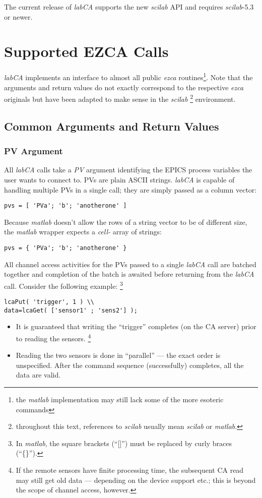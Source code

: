 \documentclass{article}
\newcommand{\sca}{\ita{labCA}}
\newcommand{\scilab}{\ita{scilab}}
\newcommand{\matlab}{\ita{matlab}}
\newcommand{\ezca}{\ita{ezca}}
\newcommand{\pbrk}{\pagebreak[3]}
\newcommand{\ita}[1]{\emph{#1}}
\renewcommand{\pbrk}{}
\begin{document}
The current release of \sca{} supports the new \scilab{} API and
requires \scilab-5.3 or newer.

\vspace*{\fill}
\pbrk
\section{Supported EZCA Calls}
\sca{} implements an interface to almost all public
\ezca{} routines\footnote{%
the \matlab{} implementation may still lack some of the
more esoteric commands}. Note that the arguments and
return values do not exactly correspond to the respective
\ezca{} originals but have been adapted to make sense
in the  \scilab{}%
\footnote{throughout this text, references to \scilab{}
usually mean \scilab{} or \matlab.}
environment.

\subsection{Common Arguments and Return Values}
\subsubsection{PV Argument}
All \sca{} calls take a \ita{PV} argument identifying
the EPICS process variables the user wants to connect to.
PVs are plain ASCII strings. \sca{} is capable of handling
multiple PVs in a single call; they are simply passed as a
column vector:
\begin{verbatim}
pvs = [ 'PVa'; 'b'; 'anotherone' ]
\end{verbatim}
Because \matlab{} doesn't allow the rows of
a string vector to be of different size, the \matlab{}
wrapper expects a \ita{cell-} array of strings:
\begin{verbatim}
pvs = { 'PVa'; 'b'; 'anotherone' }
\end{verbatim}

All channel access activities for the PVs
passed to a single \sca{} call are batched together and
completion of the batch is awaited before returning from
the \sca{} call. Consider the following example:%
\footnote{
In \matlab{}, the square brackets (``[]'') must be replaced
by curly braces (``\{\}'').}
\begin{verbatim}
lcaPut( 'trigger', 1 ) \\
data=lcaGet( ['sensor1' ; 'sens2'] );
\end{verbatim}
\begin{itemize}
%
\item It is guaranteed that writing the ``trigger''
completes (on the CA server) prior to reading the
sensors.%
\footnote{If the remote sensors have finite
processing time, the subsequent CA read may still
get old data --- depending on the device support
etc.; this is beyond the scope of channel access, however.}
%
\item Reading the two sensors is done in ``parallel'' ---
the exact order is unspecified. After the command sequence
(successfully) completes, all the data are valid.
\end{itemize}
\end{document}

